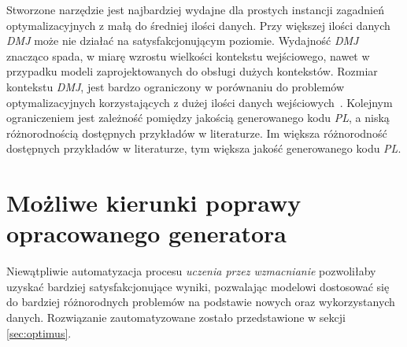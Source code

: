 Stworzone narzędzie jest najbardziej wydajne dla prostych instancji zagadnień optymalizacyjnych z małą do średniej ilości danych. %
 Przy większej ilości danych \textit{DMJ} może nie działać na satysfakcjonującym poziomie. %
 Wydajność \textit{DMJ} znacząco spada, w miarę wzrostu wielkości kontekstu wejściowego, nawet w przypadku modeli zaprojektowanych do obsługi dużych kontekstów. Rozmiar kontekstu \textit{DMJ}, jest bardzo ograniczony w porównaniu do problemów optymalizacyjnych korzystających z dużej ilości danych wejściowych~\cite{10.1162/tacl_a_00638}. Kolejnym ograniczeniem jest zależność pomiędzy jakością generowanego kodu \textit{PL}, a niską różnorodnością dostępnych przykładów w literaturze. Im większa różnorodność dostępnych przykładów w literaturze, tym większa jakość generowanego kodu \textit{PL}.
 

\section{Możliwe kierunki poprawy opracowanego generatora}
Niewątpliwie automatyzacja procesu \textit{uczenia przez wzmacnianie} pozwoliłaby uzyskać bardziej satysfakcjonujące wyniki, pozwalając modelowi dostosować się do bardziej różnorodnych problemów na podstawie nowych oraz wykorzystanych danych. Rozwiązanie zautomatyzowane zostało przedstawione w sekcji \ref{sec:optimus}. %

